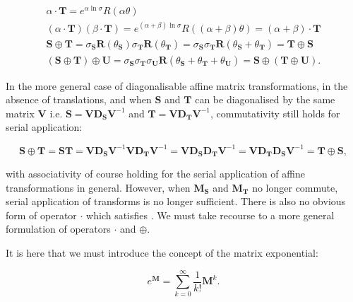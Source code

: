         \begin{gather}
            \alpha \cdot \mathbf{T} = e^{\alpha\ln\sigma}R(\alpha\theta) \\
            (\alpha \cdot \mathbf{T})(\beta \cdot \mathbf{T}) = e^{(\alpha + \beta)\ln\sigma}R((\alpha + \beta)\theta) = (\alpha + \beta) \cdot \mathbf{T} \\
			\mathbf{S} \oplus \mathbf{T} = \sigma_\mathbf{S}\mathbf{R}(\theta_\mathbf{S})\sigma_\mathbf{T}\mathbf{R}(\theta_\mathbf{T}) = \sigma_\mathbf{S}\sigma_\mathbf{T}\mathbf{R}(\theta_\mathbf{S} + \theta_\mathbf{T}) = \mathbf{T} \oplus \mathbf{S} \\
			(\mathbf{S} \oplus \mathbf{T}) \oplus \mathbf{U} = \sigma_\mathbf{S}\sigma_\mathbf{T}\sigma_\mathbf{U}\mathbf{R}(\theta_\mathbf{S} + \theta_\mathbf{T} + \theta_\mathbf{U}) = \mathbf{S} \oplus (\mathbf{T} \oplus \mathbf{U}).
        \end{gather}
		
		In the more general case of diagonalisable affine matrix transformations, in the absence of translations, and when $\mathbf{S}$ and $\mathbf{T}$ can be diagonalised by the same matrix $\mathbf{V}$ i.e. $\mathbf{S} = \mathbf{VD_SV}^{-1}$ and $\mathbf{T} = \mathbf{VD_TV}^{-1}$, commutativity still holds for serial application:
        
        \begin{equation}
			\mathbf{S} \oplus \mathbf{T} = \mathbf{ST} = \mathbf{VD_SV}^{-1}\mathbf{VD_TV}^{-1} = \mathbf{VD_SD_TV}^{-1} =\mathbf{VD_TD_SV}^{-1} = \mathbf{T} \oplus \mathbf{S},
        \end{equation}
        
        with associativity of course holding for the serial application of affine transformations in general. However, when $\mathbf{M_S}$ and $\mathbf{M_T}$ no longer commute, serial application of transforms is no longer sufficient. There is also no obvious form of operator $\cdot$ which satisfies . We must take recourse to a more general formulation of operators $\cdot$ and $\oplus$.
        
        It is here that we must introduce the concept of the matrix exponential:
        
        \begin{equation}
          e^{\mathbf{M}} = \sum_{k=0}^{\infty}\frac{1}{k!}\mathbf{M}^k. \label{eqn:matrix_exponential}
        \end{equation}
        
